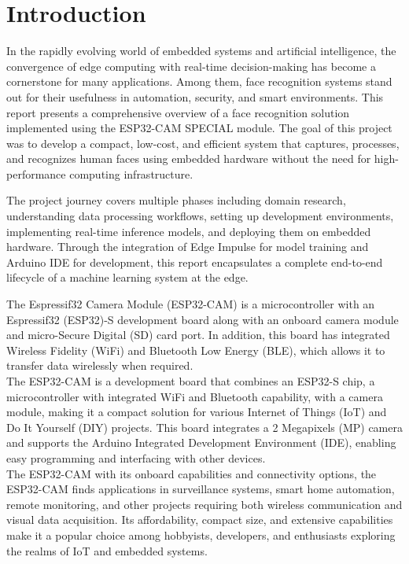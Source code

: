 \section{Introduction}
In the rapidly evolving world of embedded systems and artificial intelligence, the convergence of edge computing with real-time decision-making has become a cornerstone for many applications. Among them, face recognition systems stand out for their usefulness in automation, security, and smart environments. This report presents a comprehensive overview of a face recognition solution implemented using the ESP32-CAM SPECIAL module. The goal of this project was to develop a compact, low-cost, and efficient system that captures, processes, and recognizes human faces using embedded hardware without the need for high-performance computing infrastructure. 

The project journey covers multiple phases including domain research, understanding data processing workflows, setting up development environments, implementing real-time inference models, and deploying them on embedded hardware. Through the integration of Edge Impulse for model training and Arduino IDE for development, this report encapsulates a complete end-to-end lifecycle of a machine learning system at the edge.

The Espressif32 Camera Module (ESP32-CAM) is a  microcontroller with an Espressif32 (ESP32)-S development board along with an onboard
camera module and micro-Secure Digital (SD) card port. In addition, this board has
integrated Wireless Fidelity (WiFi) and Bluetooth Low Energy (BLE), which allows
it to transfer data wirelessly when required.\\

The ESP32-CAM is a development board that combines an ESP32-S chip, a
microcontroller with integrated WiFi and Bluetooth capability, with a camera module,
making it a compact solution for various Internet of Things (IoT) and Do It Yourself
(DIY) projects. This board integrates a 2 Megapixels (MP) camera and supports the
Arduino Integrated Development Environment (IDE), enabling easy programming and
interfacing with other devices.\\

The ESP32-CAM with its onboard capabilities and connectivity options, the ESP32-CAM
finds applications in surveillance systems, smart home automation, remote monitoring,
and other projects requiring both wireless communication and visual data acquisition. Its affordability, compact size, and extensive capabilities make it a popular
choice among hobbyists, developers, and enthusiasts exploring the realms of IoT and
embedded systems.\\

